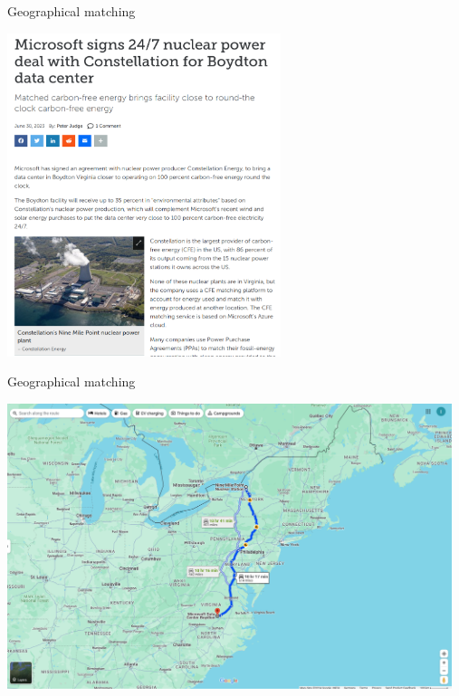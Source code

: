 \begin{frame}{Geographical matching}

  \includegraphics[width=8cm]{images/microsoft.png}

\end{frame}

\begin{frame}{Geographical matching}

  \includegraphics[width=13cm]{images/microsoft2.png}

\end{frame}
  

